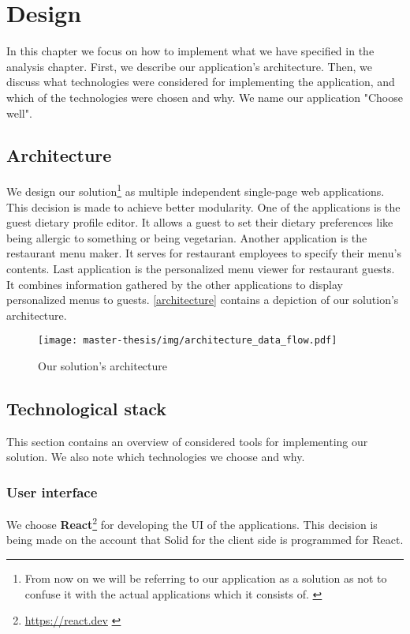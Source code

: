 \chapter{Design}
In this chapter we focus on how to implement what we have specified in the analysis chapter.
First, we describe our application's architecture.
Then, we discuss what technologies were considered for implementing the application, and which of the technologies were chosen and why.
We name our application "Choose well".

\section{Architecture}
We design our solution\footnote{From now on we will be referring to our application as a solution as not to  confuse it with the actual applications which it consists of.  \label{fnlabel}} as multiple independent single-page web applications.
This decision is made to achieve better modularity. 
One of the applications is the guest dietary profile editor.
It allows a guest to set their dietary preferences like being allergic to something or being vegetarian.
Another application is the restaurant menu maker.
It serves for restaurant employees to specify their menu's contents.
Last application is the personalized menu viewer for restaurant guests.
It combines information gathered by the other applications to display personalized menus to guests. 
\autoref{architecture} contains a depiction of our solution's architecture.

\begin{figure}[h]
  \centering
  \texttt{[image: master-thesis/img/architecture\_data\_flow.pdf]}
  \caption{Our solution's architecture} \label{architecture}
\end{figure}

\section{Technological stack}
This section contains an overview of considered tools for implementing our solution.
We also note which technologies we choose and why.

\subsection*{User interface}
We choose \textbf{React}\footnote{\url{https://react.dev}  \label{fnlabel}} for developing the UI of the applications.
This decision is being made on the account that Solid for the client side is programmed for React.

